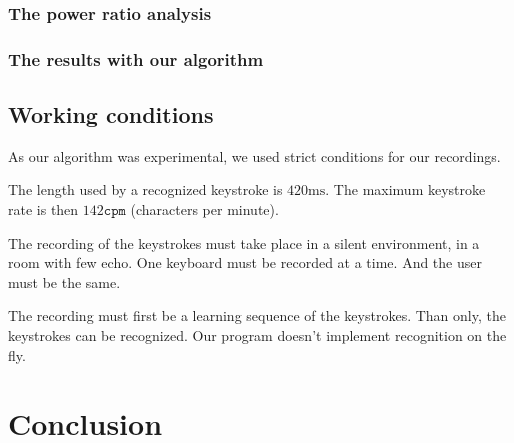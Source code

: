 \documentclass[12pt,a4paper]{article}
\begin{document}
\subsubsection{The power ratio analysis}

\subsubsection{The results with our algorithm}

\subsection{Working conditions}

As our algorithm was experimental, we used strict conditions for our recordings. 

The length used by a recognized keystroke is $420 \mathrm{ms}$. The maximum keystroke rate is then $142 \mathtt{cpm}$ (characters per minute). 

The recording of the keystrokes must take place in a silent environment, in a room with few echo. One keyboard must be recorded at a time. And the user must be the same. 

The recording must first be a learning sequence of the keystrokes. Than only, the keystrokes can be recognized. Our program doesn't implement recognition on the fly. 



\section*{Conclusion}





\end{document}
